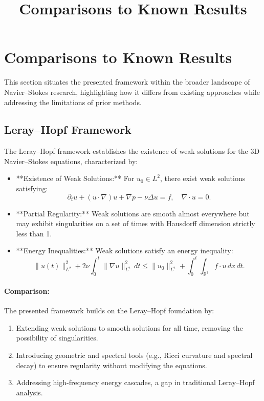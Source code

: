 \documentclass[12pt]{article}
\theoremstyle{definition}
\begin{document}
\title{Comparisons to Known Results}
\author{}
\date{}
\maketitle

\section{Comparisons to Known Results}

This section situates the presented framework within the broader landscape of Navier--Stokes research, highlighting how it differs from existing approaches while addressing the limitations of prior methods.

\subsection{Leray--Hopf Framework}

The Leray--Hopf framework establishes the existence of weak solutions for the 3D Navier--Stokes equations, characterized by:
\begin{itemize}
    \item **Existence of Weak Solutions:** For $u_0 \in L^2$, there exist weak solutions satisfying:
    \begin{equation}
    \partial_t u + (u \cdot \nabla)u + \nabla p - \nu \Delta u = f, \quad \nabla \cdot u = 0.
    \end{equation}
    \item **Partial Regularity:** Weak solutions are smooth almost everywhere but may exhibit singularities on a set of times with Hausdorff dimension strictly less than 1.
    \item **Energy Inequalities:** Weak solutions satisfy an energy inequality:
    \begin{equation}
    \|u(t)\|_{L^2}^2 + 2\nu \int_0^t \|\nabla u\|_{L^2}^2 \, dt \leq \|u_0\|_{L^2}^2 + \int_0^t \int_{\mathbb{R}^3} f \cdot u \, dx \, dt.
    \end{equation}
\end{itemize}

\paragraph{Comparison:}
The presented framework builds on the Leray--Hopf foundation by:
\begin{enumerate}
    \item Extending weak solutions to smooth solutions for all time, removing the possibility of singularities.
    \item Introducing geometric and spectral tools (e.g., Ricci curvature and spectral decay) to ensure regularity without modifying the equations.
    \item Addressing high-frequency energy cascades, a gap in traditional Leray--Hopf analysis.
\end{enumerate}
\end{document}
